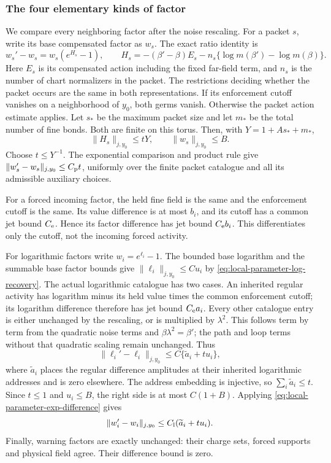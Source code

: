 \subsubsection{The four elementary kinds of factor}
We compare every neighboring factor after the noise rescaling.
For a packet $s$, write its base compensated factor as $w_s$.
The exact ratio identity is
\[
 w_s'-w_s=w_s(e^{H_s}-1),\qquad
 H_s=-(\beta'-\beta)E_s
       -n_s\{\log m(\beta')-\log m(\beta)\}.
\]
Here $E_s$ is its compensated action including the fixed far-field
term, and $n_s$ is the number of chart normalizers in the packet.
The restrictions deciding whether the packet occurs are the same in
both representations. If its enforcement cutoff vanishes on a
neighborhood of $y_0$, both germs vanish. Otherwise the packet action
estimate applies. Let $s_* $ be the maximum packet size and let $m_*$
be the total number of fine bonds. Both are finite on this torus.
Then, with $Y=1+A s_*+m_*$,
\[
 \|H_s\|_{j,y_0}\le tY,\qquad
 \|w_s\|_{j,y_0}\le B.
\]
Choose $t\le Y^{-1}$. The exponential comparison and product rule
give $\|w_s'-w_s\|_{j,y_0}\le C_{\rm p}t$, uniformly over the finite
packet catalogue and all its admissible auxiliary choices.

For a forced incoming factor, the held fine field is the same and
the enforcement cutoff is the same. Its value difference is at most
$b_i$, and its cutoff has a common jet bound $C_{\rm e}$. Hence its
factor difference has jet bound $C_{\rm e}b_i$. This differentiates
only the cutoff, not the incoming forced activity.

For logarithmic factors write $w_i=e^{\ell_i}-1$. The bounded
base logarithm and the summable base factor bounds give
$\|\ell_i\|_{j,y_0}\le C u_i$ by
\eqref{eq:local-parameter-log-recovery}. The actual logarithmic
catalogue has two cases. An inherited regular activity has logarithm
minus its held value times the common enforcement cutoff; its
logarithm difference therefore has jet bound $C_{\rm e}a_i$.
Every other catalogue entry is either unchanged by the rescaling,
or is multiplied by $\lambda^2$. This follows term by term from the
quadratic noise terms and $\beta\lambda^2=\beta'$; the path and loop
terms without that quadratic scaling remain unchanged. Thus
\[
 \|\ell_i'-\ell_i\|_{j,y_0}\le C\{\widetilde a_i+t u_i\},
\]
where $\widetilde a_i$ places the regular difference amplitudes at
their inherited logarithmic addresses and is zero elsewhere.
The address embedding is injective, so
$\sum_i\widetilde a_i\le t$. Since $t\le1$ and $u_i\le B$, the
right side is at most $C(1+B)$. Applying
\eqref{eq:local-parameter-exp-difference} gives
\[
                 \|w_i'-w_i\|_{j,y_0}
                     \le C_{\rm l}(\widetilde a_i+t u_i).
\]
Finally, warning factors are exactly unchanged: their charge sets,
forced supports and physical field agree. Their difference bound is
zero.

